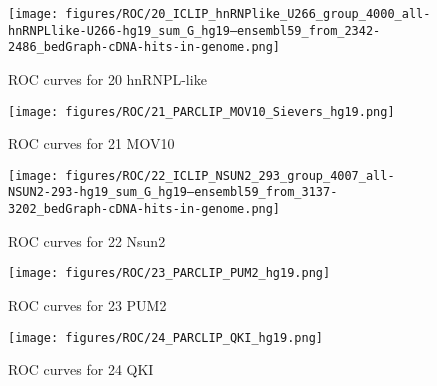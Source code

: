 \documentclass[11pt]{article}
\begin{document}
    
    
    \begin{figure}
        \begin{center}
            \texttt{[image: figures/ROC/20\_ICLIP\_hnRNPlike\_U266\_group\_4000\_all-hnRNPLlike-U266-hg19\_sum\_G\_hg19--ensembl59\_from\_2342-2486\_bedGraph-cDNA-hits-in-genome.png]}
            \caption{ROC curves for 20 hnRNPL-like}
            \label{fig:ROC20 hnRNPL-like}
        \end{center}
    \end{figure}

    
    
    \begin{figure}
        \begin{center}
            \texttt{[image: figures/ROC/21\_PARCLIP\_MOV10\_Sievers\_hg19.png]}
            \caption{ROC curves for 21 MOV10}
            \label{fig:ROC21 MOV10}
        \end{center}
    \end{figure}

    
    
    \begin{figure}
        \begin{center}
            \texttt{[image: figures/ROC/22\_ICLIP\_NSUN2\_293\_group\_4007\_all-NSUN2-293-hg19\_sum\_G\_hg19--ensembl59\_from\_3137-3202\_bedGraph-cDNA-hits-in-genome.png]}
            \caption{ROC curves for 22 Nsun2}
            \label{fig:ROC22 Nsun2}
        \end{center}
    \end{figure}

    
    
    \begin{figure}
        \begin{center}
            \texttt{[image: figures/ROC/23\_PARCLIP\_PUM2\_hg19.png]}
            \caption{ROC curves for 23 PUM2}
            \label{fig:ROC23 PUM2}
        \end{center}
    \end{figure}

    
    
    \begin{figure}
        \begin{center}
            \texttt{[image: figures/ROC/24\_PARCLIP\_QKI\_hg19.png]}
            \caption{ROC curves for 24 QKI}
            \label{fig:ROC24 QKI}
        \end{center}
    \end{figure}
\end{document}
